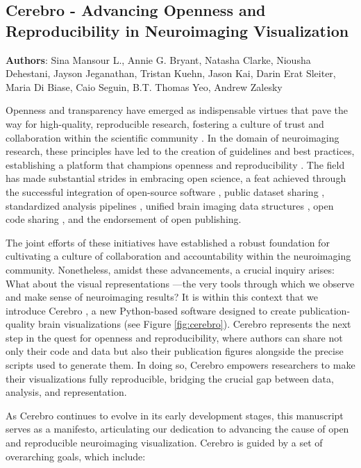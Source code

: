 \documentclass{article}
\begin{document}
\subsection{Cerebro - Advancing Openness and Reproducibility in Neuroimaging Visualization}
\textbf{Authors}: Sina Mansour L., Annie G. Bryant, Natasha Clarke, Niousha Dehestani, Jayson Jeganathan, Tristan Kuehn, Jason Kai, Darin Erat Sleiter, Maria Di Biase, Caio Seguin, B.T. Thomas Yeo, Andrew Zalesky

Openness and transparency have emerged as indispensable virtues that pave the way for high-quality, reproducible research, fostering a culture of trust and collaboration within the scientific community \cite{munafo2017manifesto}. In the domain of neuroimaging research, these principles have led to the creation of guidelines and best practices, establishing a platform that champions openness and reproducibility \cite{niso2022open}. The field has made substantial strides in embracing open science, a feat achieved through the successful integration of open-source software \cite{gorgolewski2011nipype}, public dataset sharing \cite{markiewicz2021openneuro}, standardized analysis pipelines \cite{nichols2017}, unified brain imaging data structures \cite{gorgolewski2016}, open code sharing \cite{smout2021open}, and the endorsement of open publishing.

The joint efforts of these initiatives have established a robust foundation for cultivating a culture of collaboration and accountability within the neuroimaging community. Nonetheless, amidst these advancements, a crucial inquiry arises: What about the visual representations —the very tools through which we observe and make sense of neuroimaging results? It is within this context that we introduce Cerebro \cite{sina_mansour_l_2023_8238773}, a new Python-based software designed to create publication-quality brain visualizations (see Figure \ref{fig:cerebro}). Cerebro represents the next step in the quest for openness and reproducibility, where authors can share not only their code and data but also their publication figures alongside the precise scripts used to generate them. In doing so, Cerebro empowers researchers to make their visualizations fully reproducible, bridging the crucial gap between data, analysis, and representation.

As Cerebro continues to evolve in its early development stages, this manuscript serves as a manifesto, articulating our dedication to advancing the cause of open and reproducible neuroimaging visualization. Cerebro is guided by a set of overarching goals, which include:
\end{document}
